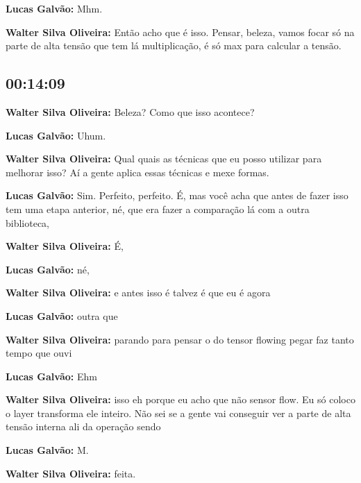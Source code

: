 \textbf{Lucas Galvão:} Mhm.



\textbf{Walter Silva Oliveira:} Então acho que é isso. Pensar, beleza, vamos focar só na parte de alta tensão que tem lá multiplicação, é só max para calcular a tensão.



\subsection{\textbf{00:14:09}}



\textbf{Walter Silva Oliveira:} Beleza? Como que isso acontece?



\textbf{Lucas Galvão:} Uhum.



\textbf{Walter Silva Oliveira:} Qual quais as técnicas que eu posso utilizar para melhorar isso? Aí a gente aplica essas técnicas e mexe formas.



\textbf{Lucas Galvão:} Sim. Perfeito, perfeito. É, mas você acha que antes de fazer isso tem uma etapa anterior, né, que era fazer a comparação lá com a outra biblioteca,



\textbf{Walter Silva Oliveira:} É,



\textbf{Lucas Galvão:} né,



\textbf{Walter Silva Oliveira:} e antes isso é talvez é que eu é agora



\textbf{Lucas Galvão:} outra que



\textbf{Walter Silva Oliveira:} parando para pensar o do tensor flowing pegar faz tanto tempo que ouvi



\textbf{Lucas Galvão:} Ehm



\textbf{Walter Silva Oliveira:} isso eh porque eu acho que não sensor flow. Eu só coloco o layer transforma ele inteiro. Não sei se a gente vai conseguir ver a parte de alta tensão interna ali da operação sendo



\textbf{Lucas Galvão:} M.



\textbf{Walter Silva Oliveira:} feita.



